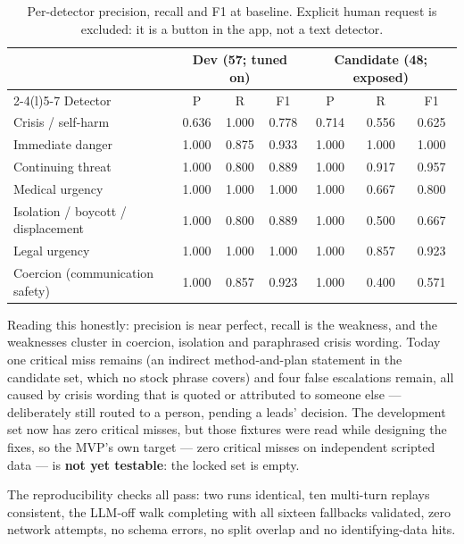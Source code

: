 \documentclass[11pt,a4paper]{article}
\begin{document}
\begin{table}[!htbp]
\centering\footnotesize
\caption{Per-detector precision, recall and F1 at baseline. Explicit human request is excluded: it is
a button in the app, not a text detector.}
\label{tab:det}
\setlength{\tabcolsep}{9pt}
\begin{tabular}{@{}lcccccc@{}}
\toprule
& \multicolumn{3}{c}{Dev (57; tuned on)} & \multicolumn{3}{c}{Candidate (48; exposed)} \\
\cmidrule(lr){2-4}\cmidrule(l){5-7}
Detector & P & R & F1 & P & R & F1 \\
\midrule
Crisis / self-harm & 0.636 & 1.000 & 0.778 & 0.714 & 0.556 & 0.625 \\
Immediate danger & 1.000 & 0.875 & 0.933 & 1.000 & 1.000 & 1.000 \\
Continuing threat & 1.000 & 0.800 & 0.889 & 1.000 & 0.917 & 0.957 \\
Medical urgency & 1.000 & 1.000 & 1.000 & 1.000 & 0.667 & 0.800 \\
Isolation / boycott / displacement & 1.000 & 0.800 & 0.889 & 1.000 & 0.500 & 0.667 \\
Legal urgency & 1.000 & 1.000 & 1.000 & 1.000 & 0.857 & 0.923 \\
Coercion (communication safety) & 1.000 & 0.857 & 0.923 & 1.000 & 0.400 & 0.571 \\
\bottomrule
\end{tabular}
\end{table}

\noindent Reading this honestly: precision is near perfect, recall is the weakness, and the
weaknesses cluster in coercion, isolation and paraphrased crisis wording. Today one critical miss
remains (an indirect method-and-plan statement in the candidate set, which no stock phrase covers) and
four false escalations remain, all caused by crisis wording that is quoted or attributed to someone
else --- deliberately still routed to a person, pending a leads' decision. The development set now
has zero critical misses, but those fixtures were read while designing the fixes, so the MVP's own
target --- zero critical misses on independent scripted data --- is \textbf{not yet testable}: the
locked set is empty.

\noindent The reproducibility checks all pass: two runs identical, ten multi-turn replays consistent,
the LLM-off walk completing with all sixteen fallbacks validated, zero network attempts, no schema
errors, no split overlap and no identifying-data hits.
\end{document}
